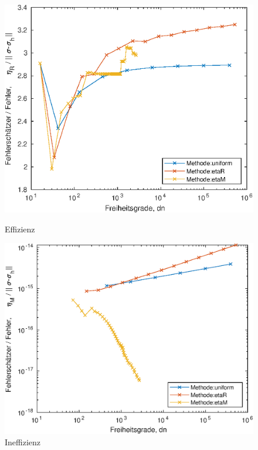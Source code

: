 \documentclass{scrartcl}
\begin{document}
\begin{figure}[h]
\centering
\begin{minipage}[b]{0.45\textwidth}
\centering
\includegraphics[width=1\textwidth]{Plots/AdaptivityBenchmarkEfficiency1}
\caption{Effizienz}
\label{pl:AdaptivityBenchmarkEfficiency}
\end{minipage}
\hfill
\begin{minipage}[b]{0.45\textwidth}
\centering
\includegraphics[width=\textwidth]{Plots/AdaptivityBenchmarkInefficiency1}
\caption{Ineffizienz}
\label{pl:AdaptivityBenchmarkInefficiency}
\end{minipage}
\end{figure}
\end{document}
